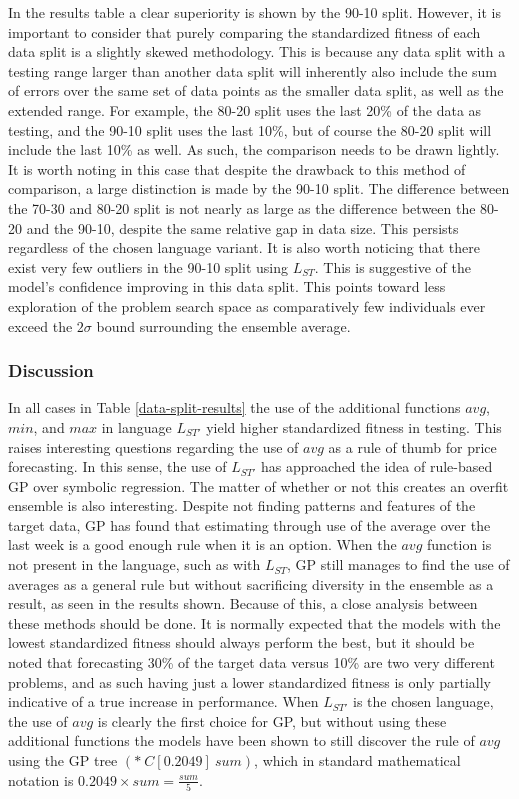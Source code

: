 \documentclass[12pt, letterpaper]{article}
\begin{document}
\textrm{ \indent In the results table a clear superiority is shown by the 90-10 split. However, it is important to consider that purely comparing the standardized fitness of each data split is a slightly skewed methodology. This is because any data split with a testing range larger than another data split will inherently also include the sum of errors over the same set of data points as the smaller data split, as well as the extended range. For example, the 80-20 split uses the last 20\% of the data as testing, and the 90-10 split uses the last 10\%, but of course the 80-20 split will include the last 10\% as well. As such, the comparison needs to be drawn lightly. It is worth noting in this case that despite the drawback to this method of comparison, a large distinction is made by the 90-10 split. The difference between the 70-30 and 80-20 split is not nearly as large as the difference between the 80-20 and the 90-10, despite the same relative gap in data size. This persists regardless of the chosen language variant. It is also worth noticing that there exist very few outliers in the 90-10 split using $L_{ST}$. This is suggestive of the model's confidence improving in this data split. This points toward less exploration of the problem search space as comparatively few individuals ever exceed the $2\sigma$ bound surrounding the ensemble average. }

\subsubsection{Discussion}

\textrm{\indent In all cases in Table \ref{data-split-results} the use of the additional functions $avg$, $min$, and $max$ in language $L_{ST'}$ yield higher standardized fitness in testing. This raises interesting questions regarding the use of $avg$ as a rule of thumb for price forecasting. In this sense, the use of $L_{ST'}$ has approached the idea of rule-based GP over symbolic regression. The matter of whether or not this creates an overfit ensemble is also interesting. Despite not finding patterns and features of the target data, GP has found that estimating through use of the average over the last week is a good enough rule when it is an option. When the $avg$ function is not present in the language, such as with $L_{ST}$, GP still manages to find the use of averages as a general rule but without sacrificing diversity in the ensemble as a result, as seen in the results shown. Because of this, a close analysis between these methods should be done. It is normally expected that the models with the lowest standardized fitness should always perform the best, but it should be noted that forecasting 30\% of the target data versus 10\% are two very different problems, and as such having just a lower standardized fitness is only partially indicative of a true increase in performance. When $L_{ST'}$ is the chosen language, the use of $avg$ is clearly the first choice for GP, but without using these additional functions the models have been shown to still discover the rule of $avg$ using the GP tree $(*\ C[0.2049]\ sum)$, which in standard mathematical notation is $0.2049\times sum = \frac{sum}{5}$. }
\end{document}
